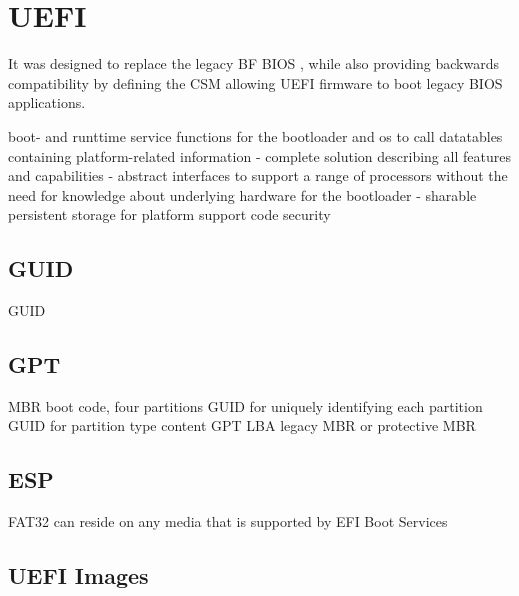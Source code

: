 
\section{\acf{UEFI}}


It was designed to replace the legacy \acl{BF} \ac{BIOS} , while also providing backwards compatibility by defining the \acf{CSM} allowing \ac{UEFI} firmware to boot legacy \ac{BIOS} applications.

boot- and runttime service functions for the bootloader and os to call
datatables containing platform-related information
- complete solution describing all features and capabilities
- abstract interfaces to support a range of processors without the need for knowledge about underlying hardware for the bootloader
- sharable persistent storage for platform support code
security

\subsection{\acf{GUID}}
\ac{GUID}

\subsection{\acf{GPT}}
\ac{MBR} boot code, four partitions
\ac{GUID} for uniquely identifying each partition
\ac{GUID} for partition type content
\ac{GPT}
\ac{LBA}
legacy \ac{MBR} or protective \ac{MBR}

\cite[5]{uefi-spec}

\subsection{\acf{ESP}}
\ac{FAT}32 \cite[13.3]{uefi-spec}
can reside on any media that is supported by EFI Boot Services
\cite[13.3.1]{uefi-spec}


\subsection{\acs{UEFI} Images}


